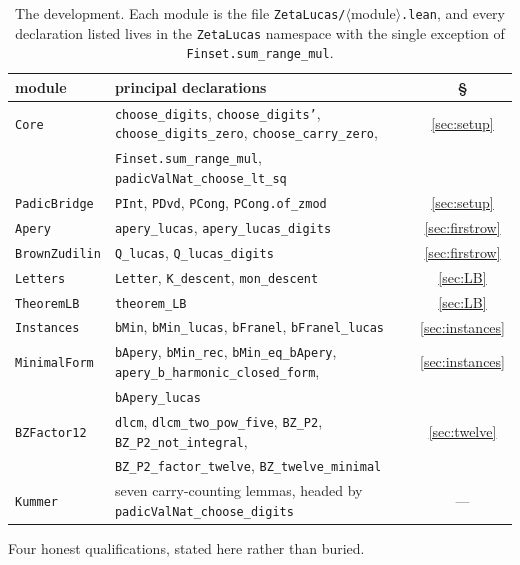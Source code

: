 \documentclass[11pt,reqno]{amsart}
\theoremstyle{plain}
\theoremstyle{definition}
\theoremstyle{remark}
\newcommand{\Ln}[1]{\texttt{#1}}
\numberwithin{equation}{section}
\begin{document}
\begin{table}[ht]
\centering\footnotesize
\caption{The development. Each module is the file
\Ln{ZetaLucas/}$\langle$module$\rangle$\Ln{.lean}, and every declaration listed lives in the
\Ln{ZetaLucas} namespace with the single exception of \Ln{Finset.sum\_range\_mul}.}
\label{tab:coverage}
\begin{tabular}{@{}llc@{}}
\toprule
module & principal declarations & \S\\
\midrule
\Ln{Core} & \Ln{choose\_digits}, \Ln{choose\_digits'}, \Ln{choose\_digits\_zero},
  \Ln{choose\_carry\_zero}, & \ref{sec:setup}\\
 & \Ln{Finset.sum\_range\_mul}, \Ln{padicValNat\_choose\_lt\_sq} & \\
\Ln{PadicBridge} & \Ln{PInt}, \Ln{PDvd}, \Ln{PCong}, \Ln{PCong.of\_zmod} & \ref{sec:setup}\\
\Ln{Apery} & \Ln{apery\_lucas}, \Ln{apery\_lucas\_digits} & \ref{sec:firstrow}\\
\Ln{BrownZudilin} & \Ln{Q\_lucas}, \Ln{Q\_lucas\_digits} & \ref{sec:firstrow}\\
\Ln{Letters} & \Ln{Letter}, \Ln{K\_descent}, \Ln{mon\_descent} & \ref{sec:LB}\\
\Ln{TheoremLB} & \Ln{theorem\_LB} & \ref{sec:LB}\\
\Ln{Instances} & \Ln{bMin}, \Ln{bMin\_lucas}, \Ln{bFranel}, \Ln{bFranel\_lucas} & \ref{sec:instances}\\
\Ln{MinimalForm} & \Ln{bApery}, \Ln{bMin\_rec}, \Ln{bMin\_eq\_bApery},
  \Ln{apery\_b\_harmonic\_closed\_form}, & \ref{sec:instances}\\
 & \Ln{bApery\_lucas} & \\
\Ln{BZFactor12} & \Ln{dlcm}, \Ln{dlcm\_two\_pow\_five}, \Ln{BZ\_P2},
  \Ln{BZ\_P2\_not\_integral}, & \ref{sec:twelve}\\
 & \Ln{BZ\_P2\_factor\_twelve}, \Ln{BZ\_twelve\_minimal} & \\
\Ln{Kummer} & seven carry-counting lemmas, headed by \Ln{padicValNat\_choose\_digits} & ---\\
\bottomrule
\end{tabular}
\end{table}

Four honest qualifications, stated here rather than buried.
\end{document}
